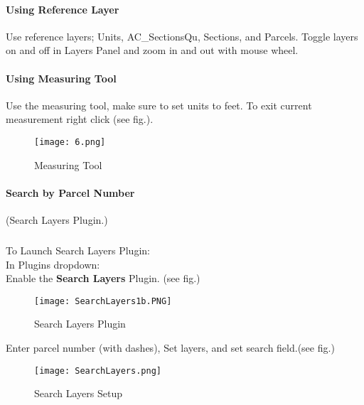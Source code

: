 \documentclass[class=book , crop=false]{standalone}
\begin{document}
\paragraph{Using Reference Layer}
\large Use reference layers; Units, AC\_SectionsQu, Sections, and Parcels.  Toggle layers on and off in Layers Panel and zoom in and out with mouse wheel.
\clearpage

\paragraph{Using Measuring Tool}
\large Use the measuring tool, make sure to set units to feet.  To exit current measurement right click (see fig.).
\begin{figure}[H]
\begin{center}
\texttt{[image: 6.png]}
\end{center}
\caption{Measuring Tool}
\end{figure}
\clearpage

\paragraph{Search by Parcel Number}
\small (Search Layers Plugin.)
\subparagraph*{}
To Launch Search Layers Plugin:\\In Plugins dropdown:\\Enable the \textbf{Search Layers} Plugin. (see fig.)
\begin{figure}[H]
\begin{center}
\texttt{[image: SearchLayers1b.PNG]}
\end{center}
\caption{Search Layers Plugin}
\end{figure}
\bigskip
Enter parcel number {\tiny (with dashes)}, Set layers, and set search field.(see fig.)
\begin{figure}[H]
\begin{center}
\texttt{[image: SearchLayers.png]}
\end{center}
\caption{Search Layers Setup}
\end{figure}

\clearpage
\end{document}
